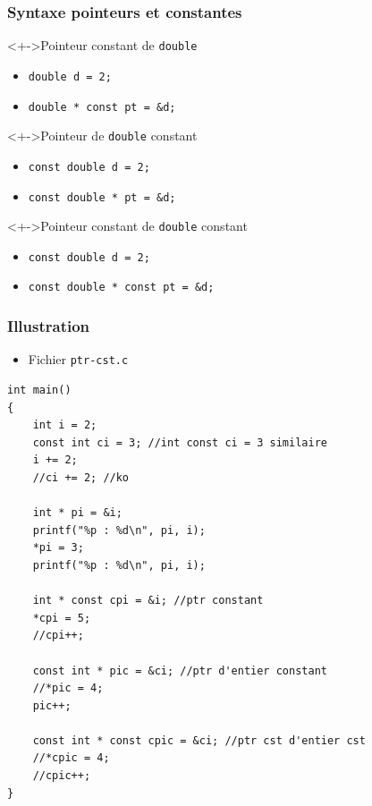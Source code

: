 \begin{frame}
\frametitle{Syntaxe pointeurs et constantes}
\begin{exampleblock}<+->{Pointeur constant de \texttt{double}}
	\begin{itemize}[<+->]
	\item \lstinline|double d = 2;|
	\item \lstinline|double * const pt = &d;|
	\end{itemize}
\end{exampleblock}
\begin{exampleblock}<+->{Pointeur de \texttt{double} constant}
	\begin{itemize}[<+->]
	\item \lstinline|const double d = 2;|
	\item \lstinline|const double * pt = &d;|
	\end{itemize}
\end{exampleblock}
\begin{exampleblock}<+->{Pointeur constant de \texttt{double} constant}
	\begin{itemize}[<+->]
	\item \lstinline|const double d = 2;|
	\item \lstinline|const double * const pt = &d;|
	\end{itemize}
\end{exampleblock}
\end{frame}

\begin{frame}[containsverbatim]
\frametitle{Illustration}
\begin{itemize}
\item Fichier \texttt{ptr-cst.c}
\end{itemize}
\begin{lstlisting}
int main()
{
	int i = 2;
	const int ci = 3; //int const ci = 3 similaire
	i += 2;
	//ci += 2; //ko

	int * pi = &i; 
	printf("%p : %d\n", pi, i);
	*pi = 3; 
	printf("%p : %d\n", pi, i);

	int * const cpi = &i; //ptr constant
	*cpi = 5;
	//cpi++;

	const int * pic = &ci; //ptr d'entier constant	
	//*pic = 4;	
	pic++;

	const int * const cpic = &ci; //ptr cst d'entier cst
	//*cpic = 4;	
	//cpic++;
}
\end{lstlisting}
\end{frame}

